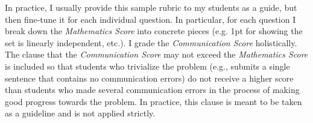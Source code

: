 \documentclass[12pt]{book}
\begin{document}
In practice, I usually provide this sample rubric to my students as a guide, but then fine-tune it for each individual question. In particular, for each question I break down the \emph{Mathematics Score} into concrete pieces (e.g. 1pt for showing the set is linearly independent, etc.). I grade the \emph{Communication Score} holistically. The clause that the \emph{Communication Score} may not exceed the \emph{Mathematics Score} is included so that students who trivialize the problem (e.g., submits a single sentence that contains no communication errors) do not receive a higher score than students who made several communication errors in the process of making good progress towards the problem. In practice, this clause is meant to be taken as a guideline and is not applied strictly.




%
%
\end{document}
